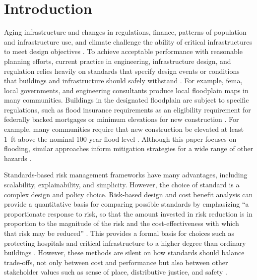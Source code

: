 \documentclass{agujournal2019}
\begin{document}
\clearpage
\section{Introduction}\label{sec:introduction}

Aging infrastructure and changes in regulations, finance, patterns of population and infrastructure use, and climate challenge the ability of critical infrastructures to meet design objectives \cite{doss-gollin_txtreme:2021,doss-gollin_fatalism:2020,chester_reliable:2020,asce_infrastructure_climate:2021,ho_dams:2017}.
To achieve acceptable performance with reasonable planning efforts, current practice in engineering, infrastructure design, and regulation relies heavily on standards that specify design events or conditions that buildings and infrastructure should safely withstand \cite{bruneau_multihazard:2017}.
For example, \gls{fema}, local governments, and engineering consultants produce local floodplain maps in many communities.
Buildings in the designated floodplain are subject to specific regulations, such as flood insurance requirements as an eligibility requirement for federally backed mortgages \cite{kousky_voucher:2014} or minimum elevations for new construction \cite{asce_24-05:2006,FEMA_p-55:2011}.
For example, many communities require that new construction be elevated at least \SI{1}{ft} above the nominal 100-year flood level \cite{zarekarizi_suboptimal:2020}.
Although this paper focuses on flooding, similar approaches inform mitigation strategies for a wide range of other hazards \cite{asce_7-10:2013}.

Standards-based risk management frameworks have many advantages, including scalability, explainability, and simplicity.
However, the choice of standard is a complex design and policy choice.
Risk-based design and cost benefit analysis \cite{eijgenraam_flooding:2014,vandantzig_dike:1956,xian_elevation:2017} can provide a quantitative basis for comparing possible standards by emphasizing ``a proportionate response to risk, so that the amount invested in risk reduction is in proportion to the magnitude of the risk and the cost-effectiveness with which that risk may be reduced'' \cite{merz_fluvial:2010}.
This provides a formal basis for choices such as protecting hospitals and critical infrastructure to a higher degree than ordinary buildings \cite{asce_7-10:2013}.
However, these methods are silent on how standards should balance trade-offs, not only between cost and performance but also between other stakeholder values such as sense of place, distributive justice, and safety \cite{keller_management:2021,helgeson_manifesto:2022,quinn_rivalframings:2017,bessette_vimm:2017,vezer_epistemic:2018}.
\end{document}
